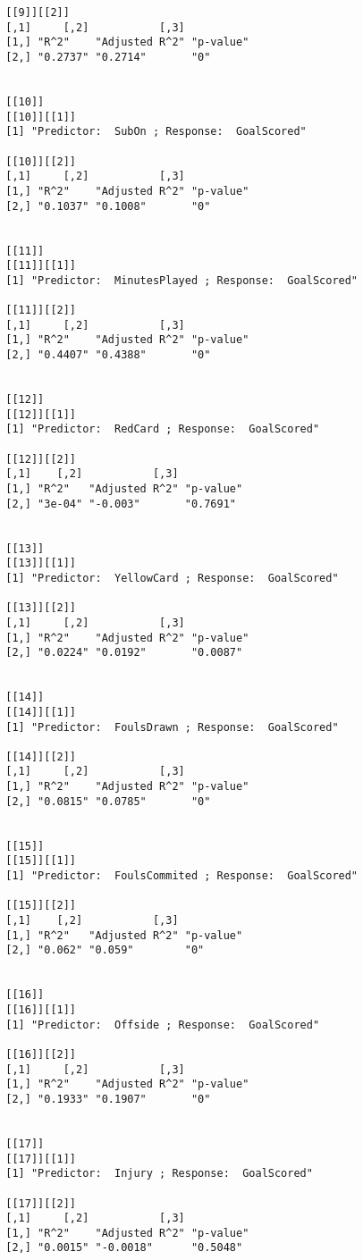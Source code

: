 \documentclass[12pt]{article}
\begin{document}
\begin{verbatim}
		[[9]][[2]]
		[,1]     [,2]           [,3]     
		[1,] "R^2"    "Adjusted R^2" "p-value"
		[2,] "0.2737" "0.2714"       "0"      
		
		
		[[10]]
		[[10]][[1]]
		[1] "Predictor:  SubOn ; Response:  GoalScored"
		
		[[10]][[2]]
		[,1]     [,2]           [,3]     
		[1,] "R^2"    "Adjusted R^2" "p-value"
		[2,] "0.1037" "0.1008"       "0"      
		
		
		[[11]]
		[[11]][[1]]
		[1] "Predictor:  MinutesPlayed ; Response:  GoalScored"
		
		[[11]][[2]]
		[,1]     [,2]           [,3]     
		[1,] "R^2"    "Adjusted R^2" "p-value"
		[2,] "0.4407" "0.4388"       "0"      
		
		
		[[12]]
		[[12]][[1]]
		[1] "Predictor:  RedCard ; Response:  GoalScored"
		
		[[12]][[2]]
		[,1]    [,2]           [,3]     
		[1,] "R^2"   "Adjusted R^2" "p-value"
		[2,] "3e-04" "-0.003"       "0.7691" 
		
		
		[[13]]
		[[13]][[1]]
		[1] "Predictor:  YellowCard ; Response:  GoalScored"
		
		[[13]][[2]]
		[,1]     [,2]           [,3]     
		[1,] "R^2"    "Adjusted R^2" "p-value"
		[2,] "0.0224" "0.0192"       "0.0087" 
		
		
		[[14]]
		[[14]][[1]]
		[1] "Predictor:  FoulsDrawn ; Response:  GoalScored"
		
		[[14]][[2]]
		[,1]     [,2]           [,3]     
		[1,] "R^2"    "Adjusted R^2" "p-value"
		[2,] "0.0815" "0.0785"       "0"      
		
		
		[[15]]
		[[15]][[1]]
		[1] "Predictor:  FoulsCommited ; Response:  GoalScored"
		
		[[15]][[2]]
		[,1]    [,2]           [,3]     
		[1,] "R^2"   "Adjusted R^2" "p-value"
		[2,] "0.062" "0.059"        "0"      
		
		
		[[16]]
		[[16]][[1]]
		[1] "Predictor:  Offside ; Response:  GoalScored"
		
		[[16]][[2]]
		[,1]     [,2]           [,3]     
		[1,] "R^2"    "Adjusted R^2" "p-value"
		[2,] "0.1933" "0.1907"       "0"      
		
		
		[[17]]
		[[17]][[1]]
		[1] "Predictor:  Injury ; Response:  GoalScored"
		
		[[17]][[2]]
		[,1]     [,2]           [,3]     
		[1,] "R^2"    "Adjusted R^2" "p-value"
		[2,] "0.0015" "-0.0018"      "0.5048" 
		
		
		
	\end{verbatim}
	
\end{document}
